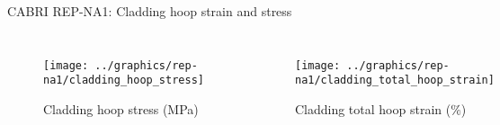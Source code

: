 \begin{frame}{CABRI REP-NA1: Cladding hoop strain and stress}
  \footnotesize 
  
  \begin{columns}[t]


  \begin{figure}[h]
    \texttt{[image: ../graphics/rep-na1/cladding\_hoop\_stress]}
    \caption{Cladding hoop stress (MPa)}
  \end{figure}  


  \begin{figure}[h]
    \texttt{[image: ../graphics/rep-na1/cladding\_total\_hoop\_strain]}
    \caption{Cladding total hoop strain ($\%$)}
  \end{figure}  
  
  \end{columns}

\end{frame}
